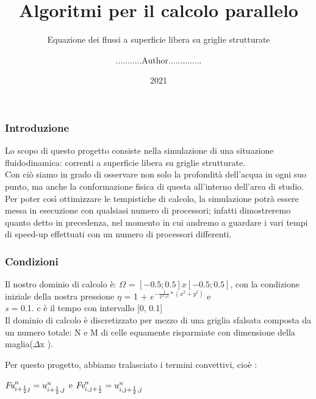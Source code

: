 \documentclass{beamer}
\title{Algoritmi per il calcolo parallelo}
\author{...........Author..............}
\date{2021}
\subtitle{Equazione dei flussi a superficie libera su griglie strutturate}
\begin{document}
	\frame{\titlepage}
	
	\begin{frame}
		\frametitle{Introduzione}
			Lo scopo di questo progetto consiste nella simulazione di una situazione fluidodinamica: correnti a superficie libera su griglie strutturate.\\
			Con ciò siamo  in grado di osservare non solo la profondità dell’acqua in ogni suo punto, ma anche la conformazione fisica di questa all’interno dell’area di studio.\\
			Per poter così ottimizzare le tempistiche di calcolo, la simulazione potrà essere messa in esecuzione con qualsiasi numero di processori; infatti dimostreremo quanto detto in precedenza, nel momento in cui andremo a guardare i vari tempi di speed-up effettuati con un numero di processori differenti.

	
	\end{frame}

	\begin{frame}
		\frametitle{Condizioni}

		Il nostro dominio di calcolo è: $\Omega$ = $ [ -0.5; 0.5 ] x [ -0.5; 0.5 ]	$, con la condizione iniziale della nostra pressione $\eta$ =  1 + $e^{ -\frac{1}{2* s^{2}} * (x^{2} + y^{2})} $ e \\ \emph{s} = 0.1. c è il tempo con intervallo [0, 0.1]\\
		
		
		Il dominio di calcolo è discretizzato per mezzo di una griglia sfalsata composta da un numero totale: N e M di celle equamente risparmiate con dimensione della maglia($\Delta$x ).
			
		Per questo progetto, abbiamo tralasciato i termini convettivi, cioè :
			\begin{center}
			
			$ \emph{Fu}_{i + \frac{1}{2} j}^{n} = u_{i+\frac{1}{2},j}^{n}	$ e $\emph{Fv}_{i,j + \frac{1}{2}} ^{n}	= u_{i, j +\frac{1}{2},j}^{n}	$
			
			\end{center}	
   	\end{frame}
\end{document}
